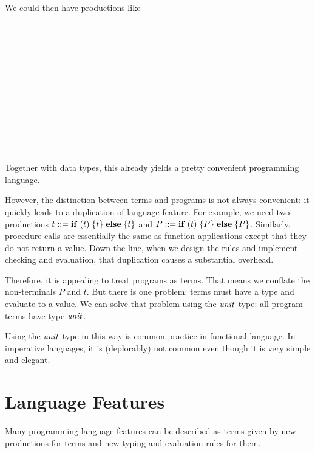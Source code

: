 We could then have productions like
\begin{commgrammar}
\\
\\
\\
\\
\\
\\
\\
\\
\\
\\
\\
\end{commgrammar}

Together with data types, this already yields a pretty convenient programming language.

However, the distinction between terms and programs is not always convenient: it quickly leads to a duplication of language feature.
For example, we need two productions $t\bbc \aifelseI{t}{t}{t}$ and $P\bbc \aifelseI{t}{P}{P}$.
Similarly, procedure calls are essentially the same as function applications except that they do not return a value.
Down the line, when we design the rules and implement checking and evaluation, that duplication causes a substantial overhead.
\medskip

Therefore, it is appealing to treat programs as terms.
That means we conflate the non-terminals $P$ and $t$.
But there is one problem: terms must have a type and evaluate to a value.
We can solve that problem using the $\mathit{unit}$ type: all program terms have type $\mathit{unit}$.

Using the $\mathit{unit}$ type in this way is common practice in functional language.
In imperative languages, it is (deplorably) not common even though it is very simple and elegant.

\section{Language Features}

Many programming language features can be described as terms given by new productions for terms and new typing and evaluation rules for them.

